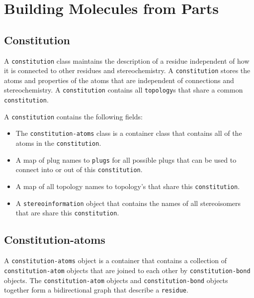 
\def\constitution{\texttt{constitution}}
\def\residue{\texttt{residue}}
\def\residues{\texttt{residues}}
\def\topology{\texttt{topology}}
\def\topologys{\texttt{topologys}}
\def\constitutionAtom{\texttt{constitution-atom}}
\def\constitutionAtoms{\texttt{constitution-atoms}}
\def\stereoisomerAtom{\texttt{stereisomer-atom}}
\def\stereoisomerAtoms{\texttt{stereisomer-atoms}}
\def\coupling{\texttt{coupling}}
\def\couplings{\texttt{couplings}}
\def\monomer{\texttt{monomer}}
\def\monomers{\texttt{monomers}}


\chapter{Building Molecules from Parts}
\label{chap-parts}

\section{Constitution}

A {\constitution} class maintains the description of a residue independent of how it is connected to other residues and stereochemistry. A {\constitution} stores the atoms and properties of the atoms that are independent of connections and stereochemistry. A {\constitution} contains all {\topology}s that share a common {\constitution}.

A {\constitution} contains the following fields:

\begin{itemize}
\item
The {\constitutionAtoms} class is a container class that contains all of the atoms in the {\constitution}.
\item
A map of plug names to \texttt{plugs} for all possible plugs that can be used to connect into or out of this {\constitution}.
\item
A map of all topology names to topology's that share this {\constitution}.
\item
A \texttt{stereoinformation} object that contains the names of all stereoisomers that are share this {\constitution}.
\end{itemize}

\section{Constitution-atoms}

A \texttt{constitution-atoms} object is a container that contains a collection of {\constitutionAtom} objects that are joined to each other by \texttt{constitution-bond} objects. The {\constitutionAtom} objects and \texttt{constitution-bond} objects together form a bidirectional graph that describe a \texttt{residue}.
